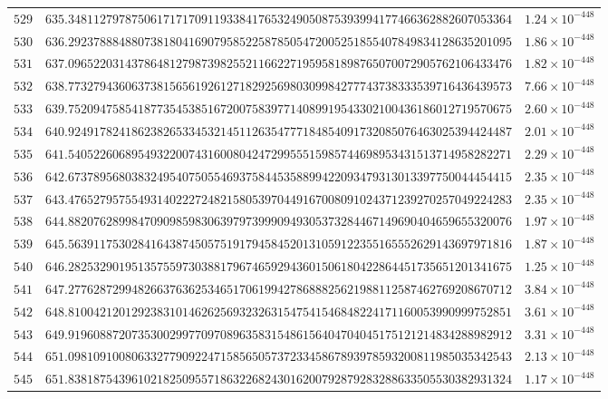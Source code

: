\documentclass[12pt,reqno]{amsart}
\theoremstyle{remark}
\begin{document}
\begin{longtable}{clc}
$529$ & $635.3481127978750617171709119338417653249050875393994177466362882607053364$ & $1.24\times 10^{-448}$ \\
$530$ & $636.2923788848807381804169079585225878505472005251855407849834128635201095$ & $1.86\times 10^{-448}$ \\
$531$ & $637.0965220314378648127987398255211662271959581898765070072905762106433476$ & $1.82\times 10^{-448}$ \\
$532$ & $638.7732794360637381565619261271829256980309984277743738333539716436439573$ & $7.66\times 10^{-448}$ \\
$533$ & $639.7520947585418773545385167200758397714089919543302100436186012719570675$ & $2.60\times 10^{-448}$ \\
$534$ & $640.9249178241862382653345321451126354777184854091732085076463025394424487$ & $2.01\times 10^{-448}$ \\
$535$ & $641.5405226068954932200743160080424729955515985744698953431513714958282271$ & $2.29\times 10^{-448}$ \\
$536$ & $642.6737895680383249540750554693758445358899422093479313013397750044454415$ & $2.35\times 10^{-448}$ \\
$537$ & $643.4765279575549314022272482158053970449167008091024371239270257049224283$ & $2.35\times 10^{-448}$ \\
$538$ & $644.8820762899847090985983063979739990949305373284467149690404659655320076$ & $1.97\times 10^{-448}$ \\
$539$ & $645.5639117530284164387450575191794584520131059122355165552629143697971816$ & $1.87\times 10^{-448}$ \\
$540$ & $646.2825329019513575597303881796746592943601506180422864451735651201341675$ & $1.25\times 10^{-448}$ \\
$541$ & $647.2776287299482663763625346517061994278688825621988112587462769208670712$ & $3.84\times 10^{-448}$ \\
$542$ & $648.8100421201292383101462625693232631547541546848224171160053990999752851$ & $3.61\times 10^{-448}$ \\
$543$ & $649.9196088720735300299770970896358315486156404704045175121214834288982912$ & $3.31\times 10^{-448}$ \\
$544$ & $651.0981091008063327790922471585650573723345867893978593200811985035342543$ & $2.13\times 10^{-448}$ \\
$545$ & $651.8381875439610218250955718632268243016200792879283288633505530382931324$ & $1.17\times 10^{-448}$ \\

\end{longtable}
\end{document}
